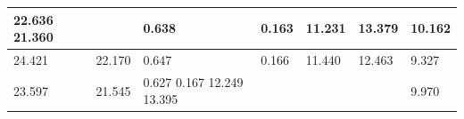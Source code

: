 \begin{tabular}{lllllll}
\toprule
22.636 21.360 &  & 0.638 & 0.163 & 11.231 & 13.379 & 10.162 \\
\midrule
24.421 & 22.170 & 0.647 & 0.166 & 11.440 & 12.463 & 9.327 \\
23.597 & 21.545 & 0.627 0.167 12.249 13.395 &  &  &  & 9.970 \\
\bottomrule
\end{tabular}

